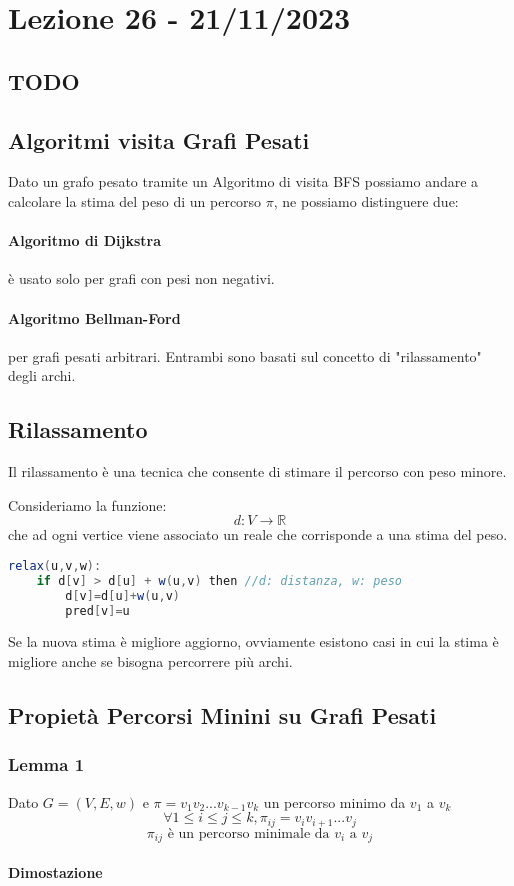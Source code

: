 \section{Lezione 26 - 21/11/2023}
\subsection{TODO}

\subsection{Algoritmi visita Grafi Pesati}
Dato un grafo pesato tramite un Algoritmo di visita BFS possiamo andare a calcolare la stima del peso di un percorso $\pi$, ne possiamo distinguere due:
\paragraph{Algoritmo di Dijkstra} è usato solo per grafi con pesi non negativi.
\paragraph{Algoritmo Bellman-Ford} per grafi pesati arbitrari.
Entrambi sono basati sul concetto di "rilassamento" degli archi.

\subsection{Rilassamento}
Il rilassamento è una tecnica che consente di stimare il percorso con peso minore.\smallskip

Consideriamo la funzione:
$$ d: V \rightarrow \mathbb{R} $$
che ad ogni vertice viene associato un reale che corrisponde a una stima del peso.
\begin{lstlisting}[language=Java]
relax(u,v,w):
    if d[v] > d[u] + w(u,v) then //d: distanza, w: peso
        d[v]=d[u]+w(u,v)
        pred[v]=u
\end{lstlisting}
Se la nuova stima è migliore aggiorno, ovviamente esistono casi in cui la stima è migliore anche se bisogna percorrere più archi.

\subsection{Propietà Percorsi Minini su Grafi Pesati}
\subsubsection{Lemma 1}
Dato $G=(V,E,w)$ e $\pi=v_1v_2...v_{k-1}v_k$ un percorso minimo da $v_1$ a $v_k$
$$ \forall 1 \le i \le j \le k, \pi_{ij}=v_iv_{i+1}...v_j$$
$$ \pi_{ij} \text{ è un percorso minimale da } v_i \text{ a } v_j$$

\paragraph{Dimostazione}